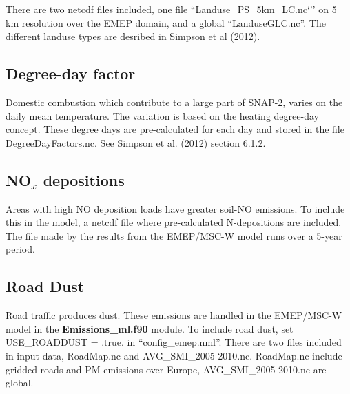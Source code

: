 There are two netcdf files included, one file ``Landuse\_PS\_5km\_LC.nc`'' on 5 km resolution over the EMEP domain, and a global ``LanduseGLC.nc''. The different landuse types are desribed in Simpson et al (2012). 

% 

\subsection{Degree-day factor}
Domestic combustion which contribute to a large part of SNAP-2, varies on the daily 
mean temperature. The variation is based on the heating degree-day concept. These 
degree days are pre-calculated for each day and stored in the file DegreeDayFactors.nc. 
See Simpson et al. (2012) section 6.1.2. 


\subsection{NO$_x$ depositions}
Areas with high NO deposition loads have greater soil-NO emissions. To include this in 
the model, a netcdf file where pre-calculated N-depositions are included. The file made by 
the results from the EMEP/MSC-W model runs over a 5-year period. 


\subsection{Road Dust}
Road traffic produces dust. These emissions are handled in the EMEP/MSC-W model in the 
{\bf Emissions\_ml.f90} module. To include road dust, set USE\_ROADDUST = .true. in ``config\_emep.nml''. There are two files included in input data, RoadMap.nc and 
AVG\_SMI\_2005-2010.nc. RoadMap.nc include gridded roads and PM emissions over Europe, 
AVG\_SMI\_2005-2010.nc are global. 


